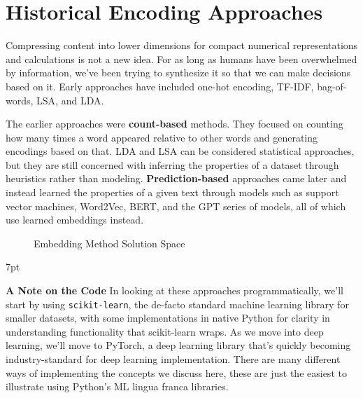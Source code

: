\documentclass[11pt, table]{diazessay} %
\newenvironment{formal}{%
  \def\FrameCommand{%
	\hspace{1pt}%
	{\color{w_lightblue}\vrule width 2pt}%
	{\color{formalshade}\vrule width 4pt}%
	\colorbox{formalshade}%
  }%
  \MakeFramed{\advance\hsize-\width\FrameRestore}%
  \noindent\hspace{-4.55pt}%
  \begin{adjustwidth}{}{7pt}%
  \vspace{2pt}\vspace{2pt}%
}
{%
  \vspace{2pt}\end{adjustwidth}\endMakeFramed%
}
\begin{document}
\begin{sloppypar}
\section{Historical Encoding Approaches}

Compressing content into lower dimensions for compact numerical representations and calculations is not a new idea. For as long as humans have been overwhelmed by information, we've been trying to synthesize it so that we can make decisions based on it. Early approaches have included one-hot encoding, TF-IDF, bag-of-words, LSA, and LDA.

The earlier approaches were \textbf{count-based} methods. They focused on counting how many times a word appeared relative to other words and generating encodings based on that. LDA and LSA can be considered statistical approaches, but they are still concerned with inferring the properties of a dataset through heuristics rather than modeling. \textbf{Prediction-based} approaches came later and instead learned the properties of a given text through models  such as support vector machines, Word2Vec, BERT, and the GPT series of models, all of which use learned embeddings instead.

\begin{figure}[H]
    \centering
	 \caption{Embedding Method Solution Space}
\end{figure}

\begin{formal}
\textbf{A Note on the Code}
In looking at these approaches programmatically, we'll start by using \texttt{scikit-learn}, the de-facto standard machine learning library for smaller datasets, with some implementations in native Python for clarity in understanding functionality that scikit-learn wraps.  As we move into deep learning, we'll move to PyTorch, a deep learning library that's quickly becoming industry-standard for deep learning implementation. There are many different ways of implementing the concepts we discuss here, these are just the easiest to illustrate using Python's ML lingua franca libraries.
\end{formal}


\end{sloppypar}
\end{document}
